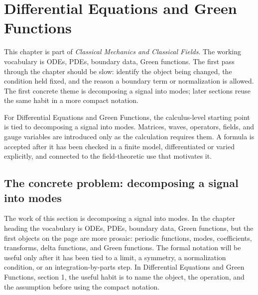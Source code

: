 \chapter{Differential Equations and Green Functions}


This chapter is part of \emph{Classical Mechanics and Classical Fields}.  The working vocabulary is ODEs, PDEs, boundary data, Green functions.  The first pass through the chapter should be slow: identify the object being changed, the condition held fixed, and the reason a boundary term or normalization is allowed.  The first concrete theme is decomposing a signal into modes; later sections reuse the same habit in a more compact notation.

For Differential Equations and Green Functions, the calculus-level starting point is tied to decomposing a signal into modes.  Matrices, waves, operators, fields, and gauge variables are introduced only as the calculation requires them.  A formula is accepted after it has been checked in a finite model, differentiated or varied explicitly, and connected to the field-theoretic use that motivates it.

\section{The concrete problem: decomposing a signal into modes}













The work of this section is decomposing a signal into modes.  In the chapter heading the vocabulary is ODEs, PDEs, boundary data, Green functions, but the first objects on the page are more prosaic: periodic functions, modes, coefficients, transforms, delta functions, and Green functions.  The formal notation will be useful only after it has been tied to a limit, a symmetry, a normalization condition, or an integration-by-parts step.  In Differential Equations and Green Functions, section 1, the useful habit is to name the object, the operation, and the assumption before using the compact notation.


